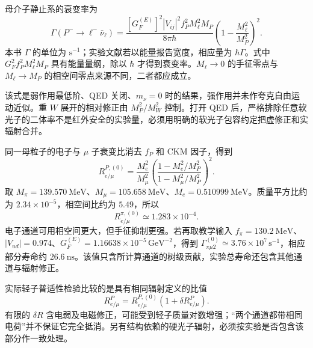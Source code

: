 母介子静止系的衰变率为
\begin{equation}
 \Gamma(P^-\to\ell^-\bar\nu_\ell)
 =\frac{[G_F^{(E)}]^2|V_{ij}|^2f_P^2M_\ell^2M_P}{8\pi\hbar}
 \left(1-\frac{M_\ell^2}{M_P^2}\right)^2.
 \label{eq:sm-pseudoscalar-width}
\end{equation}
本书 $\Gamma$ 的单位为 $\mathrm{s^{-1}}$；实验文献若以能量报告宽度，相应量为 $\hbar\Gamma$。式中 $G_F^2f_P^2M_\ell^2M_P$ 具有能量量纲，除以 $\hbar$ 才得到衰变率。$M_\ell\to0$ 的手征零点与 $M_\ell\to M_P$ 的相空间零点来源不同，二者都应成立。

该式是弱作用最低阶、QED 关闭、$m_\nu=0$ 时的结果，强作用并未作夸克自由运动近似。重 $W$ 展开的相对修正由 $M_P^2/M_W^2$ 控制。打开 QED 后，严格排除任意软光子的二体率不是红外安全的实验量，必须用明确的软光子包容约定把虚修正和实辐射合并。

\begin{exbox}
同一母粒子的电子与 $\mu$ 子衰变比消去 $f_P$ 和 CKM 因子，得到
\begin{equation}
 R_{e/\mu}^{P,(0)}
 =\frac{M_e^2}{M_\mu^2}
 \left(\frac{1-M_e^2/M_P^2}{1-M_\mu^2/M_P^2}\right)^2.
 \label{eq:sm-pseudoscalar-universality-ratio}
\end{equation}
取 $M_\pi=\SI{139.570}{\mega\electronvolt}$、$M_\mu=\SI{105.658}{\mega\electronvolt}$、$M_e=\SI{0.510999}{\mega\electronvolt}$。质量平方比约为 $2.34\times10^{-5}$，相空间比约为 $5.49$，所以
\begin{equation*}
 R_{e/\mu}^{\pi,(0)}\simeq1.283\times10^{-4}.
\end{equation*}
电子通道可用相空间更大，但手征抑制更强。若再取教学输入 $f_\pi=\SI{130.2}{\mega\electronvolt}$、$|V_{ud}|=0.974$、$G_F^{(E)}=1.16638\times10^{-5}\,\mathrm{GeV^{-2}}$，得到 $\Gamma_{\pi\mu2}^{(0)}\simeq3.76\times10^7\,\mathrm{s^{-1}}$，相应部分寿命约 $\SI{26.6}{\nano\second}$。该值只含所计算通道的树级贡献，实验总寿命还包含其他通道与辐射修正。

实际轻子普适性检验比较的是具有相同辐射定义的比值
\begin{equation*}
 R_{e/\mu}^{P}=R_{e/\mu}^{P,(0)}(1+\delta R_{e/\mu}^{P}).
\end{equation*}
有限的 $\delta R$ 含电弱及电磁修正，可能受到轻子质量对数增强；“两个通道都带相同电荷”并不保证它完全抵消。另有结构依赖的硬光子辐射，必须按实验是否包含该部分作一致处理。
\end{exbox}

